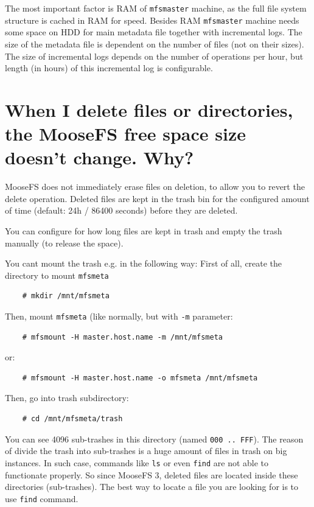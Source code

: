 \documentclass[a4paper,11pt,english]{report}
\def\code#1{\texttt{#1}}
\begin{document}
		The most important factor is RAM of \code{mfsmaster} machine, as the full file system structure is cached in RAM for speed. Besides RAM \code{mfsmaster} machine needs some space on HDD for main metadata file together with incremental logs.  
		The size of the metadata file is dependent on the number of files (not on their sizes). The size of incremental logs depends on the number of operations per hour, but length (in hours) of this incremental log is configurable.
		
		\section{When I delete files or directories, the MooseFS free space size doesn't change. Why?}
		MooseFS does not immediately erase files on deletion, to allow you to revert the delete operation. Deleted files are kept in the trash bin for the configured amount of time (default: 24h / 86400 seconds) before they are deleted.  
		
		You can configure for how long files are kept in trash and empty the trash manually (to release the space).
		
		You cant mount the trash e.g. in the following way:
		First of all, create the directory to mount \code{mfsmeta}
		\begin{lstlisting}
	# mkdir /mnt/mfsmeta
		\end{lstlisting}
		
		Then, mount \code{mfsmeta} (like normally, but with \code{-m} parameter:
		\begin{lstlisting}
	# mfsmount -H master.host.name -m /mnt/mfsmeta
		\end{lstlisting}
		or:
		\begin{lstlisting}
	# mfsmount -H master.host.name -o mfsmeta /mnt/mfsmeta
		\end{lstlisting}
		
		Then, go into trash subdirectory:
		\begin{lstlisting}
	# cd /mnt/mfsmeta/trash
		\end{lstlisting}
		
		You can see 4096 sub-trashes in this directory (named \code{000 .. FFF}). The reason of divide the trash into sub-trashes is a huge amount of files in trash on big instances. In such case, commands like \code{ls} or even \code{find} are not able to functionate properly. So since MooseFS 3, deleted files are located inside these directories (sub-trashes). The best way to locate a file you are looking for is to use \code{find} command.
		
\end{document}
